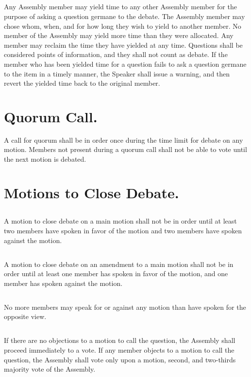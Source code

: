 \documentclass{rules}
\begin{document}
\subsection{}
Any Assembly member may yield time to any other Assembly member for the purpose of asking a question germane to the debate.  The Assembly member may chose whom, when, and for how long they wish to yield to another member.  No member of the Assembly may yield more time than they were allocated.  Any member may reclaim the time they have yielded at any time.  Questions shall be considered points of information, and they shall not count as debate.  If the member who has been yielded time for a question fails to ask a question germane to the item in a timely manner, the Speaker shall issue a warning, and then revert the yielded time back to the original member.
\section{Quorum Call.}
A call for quorum shall be in order once during the time limit for debate on any motion.  Members not present during a quorum call shall not be able to vote until the next motion is debated.
\section{Motions to Close Debate.}
\subsection{}
A motion to close debate on a main motion shall not be in order until at least two members have spoken in favor of the motion and two members have spoken against the motion.  
\subsection{}
A motion to close debate on an amendment to a main motion shall not be in order until at least one member has spoken in favor of the motion, and one member has spoken against the motion.
\subsection{}
No more members may speak for or against any motion than have spoken for the opposite view.
\subsection{}
If there are no objections to a motion to call the question, the Assembly shall proceed immediately to a vote.  If any member objects to a motion to call the question, the Assembly shall vote only upon a motion, second, and two-thirds majority vote of the Assembly.
\end{document}
